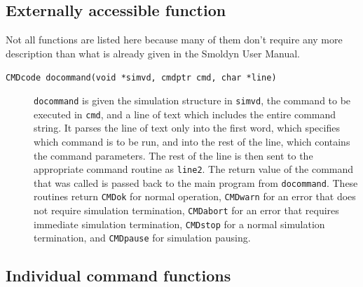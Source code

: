 \documentclass {scrbook}
\newcommand {\ttt} {\texttt}
\begin{document}
\subsection{Externally accessible function}

Not all functions are listed here because many of them don't require any more description than what is already given in the Smoldyn User Manual.

\begin{description}

\item[\ttt{CMDcode docommand(void *simvd, cmdptr cmd, char *line)}]
\ttt{docommand} is given the simulation structure in \ttt{simvd}, the command to be executed in \ttt{cmd}, and a line of text which includes the entire command string. It parses the line of text only into the first word, which specifies which command is to be run, and into the rest of the line, which contains the command parameters. The rest of the line is then sent to the appropriate command routine as \ttt{line2}. The return value of the command that was called is passed back to the main program from \ttt{docommand}. These routines return \ttt{CMDok} for normal operation, \ttt{CMDwarn} for an error that does not require simulation termination, \ttt{CMDabort} for an error that requires immediate simulation termination, \ttt{CMDstop} for a normal simulation termination, and \ttt{CMDpause} for simulation pausing.

\end{description}

\subsection{Individual command functions}
\end{document}
